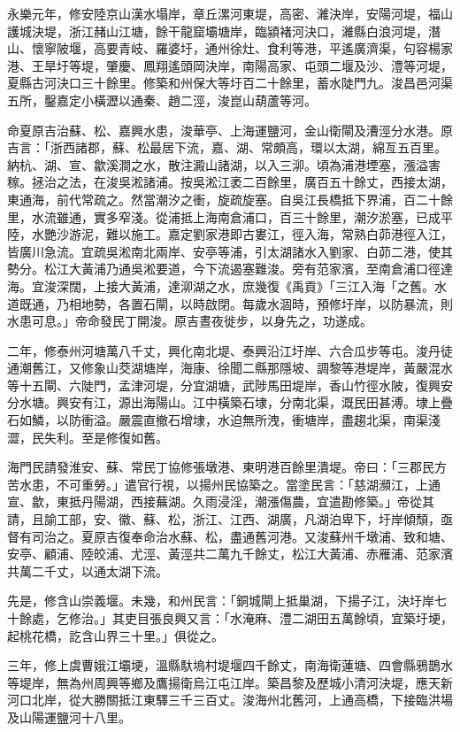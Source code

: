 永樂元年，修安陸京山漢水塌岸，章丘漯河東堤，高密、濰決岸，安陽河堤，福山護城決堤，浙江赭山江塘，餘干龍窟壩塘岸，臨潁褚河決口，濰縣白浪河堤，潛山、懷寧陂堰，高要青岐、羅婆圩，通州徐灶、食利等港，平遙廣濟渠，句容楊家港、王旱圩等堤，肇慶、鳳翔遙頭岡決岸，南陽高家、屯頭二堰及沙、澧等河堤，夏縣古河決口三十餘里。修築和州保大等圩百二十餘里，蓄水陡門九。浚昌邑河渠五所，鑿嘉定小橫瀝以通秦、趙二涇，浚崑山葫蘆等河。

命夏原吉治蘇、松、嘉興水患，浚華亭、上海運鹽河，金山衛閘及漕涇分水港。原吉言：「浙西諸郡，蘇、松最居下流，嘉、湖、常頗高，環以太湖，綿亙五百里。納杭、湖、宣、歙溪澗之水，散注澱山諸湖，以入三泖。頃為浦港堙塞，漲溢害稼。拯治之法，在浚吳淞諸浦。按吳淞江袤二百餘里，廣百五十餘丈，西接太湖，東通海，前代常疏之。然當潮汐之衝，旋疏旋塞。自吳江長橋抵下界浦，百二十餘里，水流雖通，實多窄淺。從浦抵上海南倉浦口，百三十餘里，潮汐淤塞，已成平陸，水艷沙游泥，難以施工。嘉定劉家港即古婁江，徑入海，常熟白茆港徑入江，皆廣川急流。宜疏吳淞南北兩岸、安亭等浦，引太湖諸水入劉家、白茆二港，使其勢分。松江大黃浦乃通吳淞要道，今下流遏塞難浚。旁有范家濱，至南倉浦口徑達海。宜浚深闊，上接大黃浦，達泖湖之水，庶幾復《禹貢》「三江入海「之舊。水道既通，乃相地勢，各置石閘，以時啟閉。每歲水涸時，預修圩岸，以防暴流，則水患可息。」帝命發民丁開浚。原吉晝夜徙步，以身先之，功遂成。

二年，修泰州河塘萬八千丈，興化南北堤、泰興沿江圩岸、六合瓜步等屯。浚丹徒通潮舊江，又修象山茭湖塘岸，海康、徐聞二縣那隱坡、調黎等港堤岸，黃嚴混水等十五閘、六陡門，孟津河堤，分宜湖塘，武陟馬田堤岸，香山竹徑水陂，復興安分水塘。興安有江，源出海陽山。江中橫築石埭，分南北渠，溉民田甚溥。埭上疊石如鱗，以防衝溢。嚴震直撤石增埭，水迫無所洩，衝塘岸，盡趨北渠，南渠淺澀，民失利。至是修復如舊。

海門民請發淮安、蘇、常民丁協修張墩港、東明港百餘里潰堤。帝曰：「三郡民方苦水患，不可重勞。」遣官行視，以揚州民協築之。當塗民言：「慈湖瀕江，上通宣、歙，東抵丹陽湖，西接蕪湖。久雨浸淫，潮漲傷農，宜遣勘修築。」帝從其請，且諭工部，安、徽、蘇、松，浙江、江西、湖廣，凡湖泊卑下，圩岸傾頹，亟督有司治之。夏原吉復奉命治水蘇、松，盡通舊河港。又浚蘇州千墩浦、致和塘、安亭、顧浦、陸皎浦、尤涇、黃涇共二萬九千餘丈，松江大黃浦、赤雁浦、范家濱共萬二千丈，以通太湖下流。

先是，修含山崇義堰。未幾，和州民言：「銅城閘上抵巢湖，下揚子江，決圩岸七十餘處，乞修治。」其吏目張良興又言：「水淹麻、澧二湖田五萬餘頃，宜築圩埂，起桃花橋，訖含山界三十里。」俱從之。

三年，修上虞曹娥江壩埂，溫縣馱塢村堤堰四千餘丈，南海衛蓮塘、四會縣鴉鵲水等堤岸，無為州周興等鄉及鷹揚衛烏江屯江岸。築昌黎及歷城小清河決堤，應天新河口北岸，從大勝關抵江東驛三千三百丈。浚海州北舊河，上通高橋，下接臨洪場及山陽運鹽河十八里。


